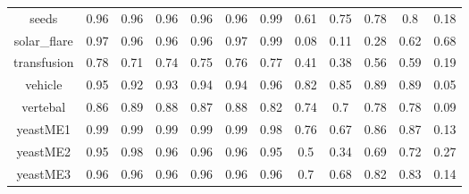 \documentclass{article}%
\begin{document}
\begin{tabular}{|c|c|c|c|c|c|c|c|c|c|c|c|}
seeds&0.96&0.96&0.96&0.96&0.96&0.99&0.61&0.75&0.78&0.8&0.18\\%
solar\_flare&0.97&0.96&0.96&0.96&0.97&0.99&0.08&0.11&0.28&0.62&0.68\\%
transfusion&0.78&0.71&0.74&0.75&0.76&0.77&0.41&0.38&0.56&0.59&0.19\\%
vehicle&0.95&0.92&0.93&0.94&0.94&0.96&0.82&0.85&0.89&0.89&0.05\\%
vertebal&0.86&0.89&0.88&0.87&0.88&0.82&0.74&0.7&0.78&0.78&0.09\\%
yeastME1&0.99&0.99&0.99&0.99&0.99&0.98&0.76&0.67&0.86&0.87&0.13\\%
yeastME2&0.95&0.98&0.96&0.96&0.96&0.95&0.5&0.34&0.69&0.72&0.27\\%
yeastME3&0.96&0.96&0.96&0.96&0.96&0.96&0.7&0.68&0.82&0.83&0.14\\%
\hline%
\end{tabular}

%
\end{document}
